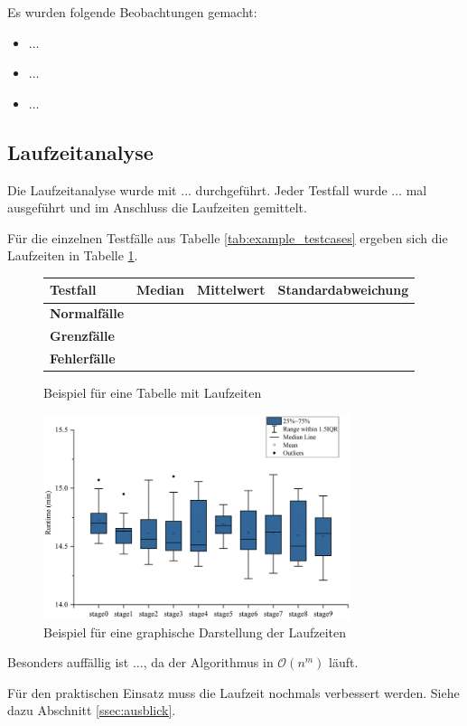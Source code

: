 Es wurden folgende Beobachtungen gemacht:
\begin{itemize}
    \item $\ldots$
    \item $\ldots$
    \item $\ldots$
\end{itemize}

\subsection{Laufzeitanalyse}
\label{ssec:laufzeitanalyse}

Die Laufzeitanalyse wurde mit $\ldots$ durchgeführt.
Jeder Testfall wurde $\ldots$ mal ausgeführt und im Anschluss die Laufzeiten gemittelt.

Für die einzelnen Testfälle aus Tabelle \ref{tab:example_testcases} ergeben sich die Laufzeiten in Tabelle \ref{tab:example_runtime}.

\begin{figure}[H]
    \centering
    \begin{tabular}{|l|l|l|l|}
        \hline
        \textbf{Testfall}    & \textbf{Median} & \textbf{Mittelwert} & \textbf{Standardabweichung} \\
        \hline
        \hline
        \textbf{Normalfälle} &                 &                     &                             \\
        \hline
        \hline
        \textbf{Grenzfälle}  &                 &                     &                             \\
        \hline
        \hline
        \textbf{Fehlerfälle} &                 &                     &                             \\
        \hline
    \end{tabular}
    \caption{Beispiel für eine Tabelle mit Laufzeiten}
    \label{tab:example_runtime}
\end{figure}

\begin{figure}[H]
    \centering
    \includegraphics[width=0.8\textwidth]{figures/example_runtime.png}
    \caption{Beispiel für eine graphische Darstellung der Laufzeiten}
    \label{fig:example_runtime}
\end{figure}

Besonders auffällig ist $\ldots$, da der Algorithmus in $\mathcal{O}(n^m)$ läuft.

Für den praktischen Einsatz muss die Laufzeit nochmals verbessert werden.
Siehe dazu Abschnitt \ref{ssec:ausblick}.